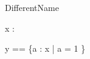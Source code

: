 \begin{zsection}
  \SECTION DifferentName
\end{zsection}

\begin{axdef}
  x : \power\arithmos
\end{axdef}

\begin{axdef}
  y == \{a : x | a = 1 \}
\end{axdef}

